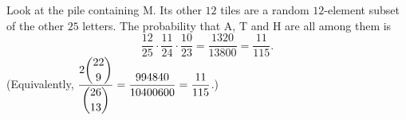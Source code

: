 Look at the pile containing M. Its other $12$ tiles are a random $12$-element subset of the other $25$ letters. The probability that A, T and H are all among them is
\[
\dfrac{12}{25}\cdot\dfrac{11}{24}\cdot\dfrac{10}{23}=\dfrac{1320}{13800}=\boxed{\dfrac{11}{115}} .
\]
(Equivalently, $\dfrac{2\dbinom{22}{9}}{\dbinom{26}{13}}=\dfrac{994840}{10400600}=\dfrac{11}{115}$.)
